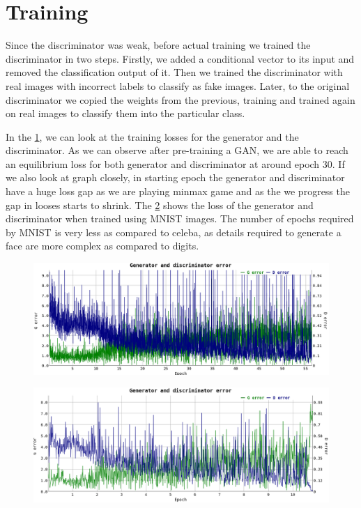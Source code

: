 \section{Training}
Since the discriminator was weak, before actual training we trained the discriminator in two steps. Firstly, we added a conditional vector to its input and removed the classification output of it. Then we trained the discriminator with real images with incorrect labels to classify as fake images. Later, to the original discriminator we copied the weights from the previous, training and trained again on real images to classify them into the particular class.  


In the \cref{fig:train-celeba}, we can look at the training losses for the generator and the discriminator. As we can observe after pre-training a GAN, we are able to reach an equilibrium loss for both generator and discriminator at around epoch 30. If we also look at graph closely, in starting epoch the generator and discriminator have a huge loss gap as we are playing minmax game and as the we progress the gap in looses starts to shrink. The \cref{fig:train-mnist} shows the loss of the generator and discriminator when trained using MNIST \cite{MNIST} images. The number of epochs required by MNIST is very less as compared to celeba, as details required to generate a face are more complex as compared to digits.

\begin{figure}[H]
  \centering
    \includegraphics[scale=.4, angle=0]{Files/Training-2.png}
    \caption[Generator Discrminator Loss for Celeba dataset]{}
    \label{fig:train-celeba}
\end{figure}

\begin{figure}[H]
  \centering
    \includegraphics[scale=.4, angle=0]{Files/MNIST-GAN.png}
    \caption[Generator Discrminator Loss for MNIST dataset]{}
    \label{fig:train-mnist}
\end{figure}
